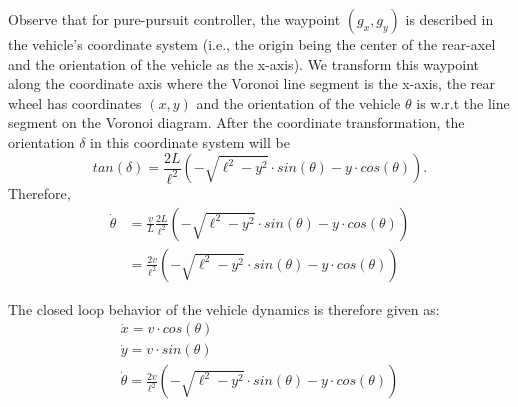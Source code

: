 Observe that for pure-pursuit controller, the waypoint $(g_x, g_y)$ is described in the vehicle's coordinate system (i.e., the origin being the center of the rear-axel and the orientation of the vehicle as the x-axis).
%
We transform this waypoint along the coordinate axis where the Voronoi line segment is the x-axis, the rear wheel has coordinates $(x,y)$ and the orientation of the vehicle $\theta$ is w.r.t the line segment on the Voronoi diagram.
After the coordinate transformation, the orientation $\delta$ in this coordinate system will be
$$ tan(\delta) = \frac{2L}{\ell^2} (-\sqrt{\ell^2-y^2} \cdot sin(\theta)-y \cdot cos(\theta)). $$
Therefore,
\begin{align}
\dot{\theta} & = \frac{\displaystyle v}{\displaystyle L} \frac{\displaystyle 2L}{\displaystyle \ell^2} (-\sqrt{\ell^2-y^2} \cdot sin(\theta)-y \cdot cos(\theta)) \nonumber \\
& = \frac{\displaystyle 2v}{\displaystyle \ell^2} (-\sqrt{\ell^2-y^2} \cdot sin(\theta)-y \cdot cos(\theta))
\end{align}

The closed loop behavior of the vehicle dynamics is therefore given as:
\[
\begin{array}{l}
     \dot{x} = v \cdot cos(\theta) \\
     \dot{y} = v \cdot sin(\theta) \\
     \dot{\theta} = \frac{\displaystyle 2v}{\displaystyle \ell^2} (-\sqrt{\ell^2-y^2} \cdot sin(\theta)-y \cdot cos(\theta))
\end{array}
\]



